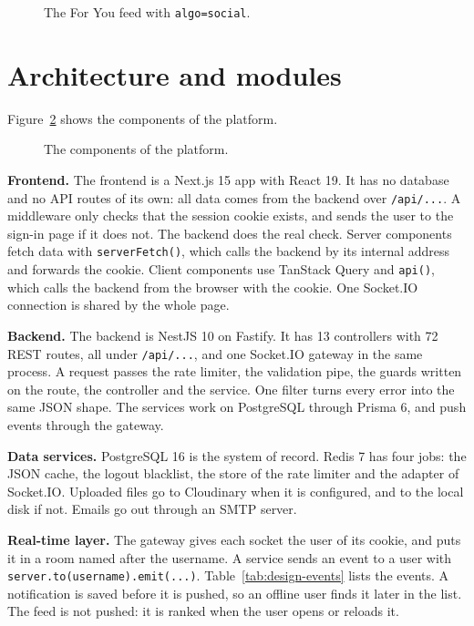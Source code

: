 \begin{figure}[htbp]
  \centering
  \caption{The For You feed with \texttt{algo=social}.}
  \label{fig:design-social}
\end{figure}

\section{Architecture and modules}
\label{sec:design-architecture}

Figure~\ref{fig:design-components} shows the components of the platform.

\begin{figure}[htbp]
  \centering
  \caption{The components of the platform.}
  \label{fig:design-components}
\end{figure}

\textbf{Frontend.} The frontend is a Next.js 15 app with React 19. It has no database and no API routes of its own: all data comes from the backend over \texttt{/api/...}. A middleware only checks that the session cookie exists, and sends the user to the sign-in page if it does not. The backend does the real check. Server components fetch data with \texttt{serverFetch()}, which calls the backend by its internal address and forwards the cookie. Client components use TanStack Query and \texttt{api()}, which calls the backend from the browser with the cookie. One Socket.IO connection is shared by the whole page.

\textbf{Backend.} The backend is NestJS 10 on Fastify. It has 13 controllers with 72 REST routes, all under \texttt{/api/...}, and one Socket.IO gateway in the same process. A request passes the rate limiter, the validation pipe, the guards written on the route, the controller and the service. One filter turns every error into the same JSON shape. The services work on PostgreSQL through Prisma 6, and push events through the gateway.

\textbf{Data services.} PostgreSQL 16 is the system of record. Redis 7 has four jobs: the JSON cache, the logout blacklist, the store of the rate limiter and the adapter of Socket.IO. Uploaded files go to Cloudinary when it is configured, and to the local disk if not. Emails go out through an SMTP server.

\textbf{Real-time layer.} The gateway gives each socket the user of its cookie, and puts it in a room named after the username. A service sends an event to a user with \texttt{server.to(username).emit(...)}. Table~\ref{tab:design-events} lists the events. A notification is saved before it is pushed, so an offline user finds it later in the list. The feed is not pushed: it is ranked when the user opens or reloads it.

